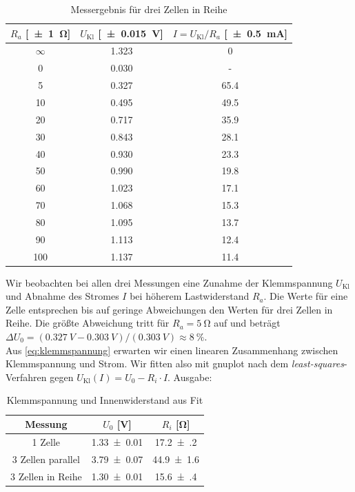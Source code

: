 \begin{table}[H]
  \centering
  \begin{tabular}{c c c} \toprule
    $R_a$ [\SI{\pm1}{\ohm}] & $U_{\text{Kl}}$ [\SI{\pm .015}{V}] & $I=U_{\text{Kl}}/R_a$ [\SI{\pm .5}{mA}] \\ \midrule
    $\infty$ & \num{1.323} & 0 \\
    0 & \num{0.030} & - \\
    5 & \num{0.327} & \num{65.4} \\
    10 & \num{.495} & \num{49.5} \\
    20 & \num{.717} & \num{35.9} \\
    30 & \num{.843} & \num{28.1} \\
    40 & \num{.930} & \num{23.3} \\
    50 & \num{.990} & \num{19.8} \\
    60 & \num{1.023} & \num{17.1} \\
    70 & \num{1.068} & \num{15.3} \\
    80 & \num{1.095} & \num{13.7} \\
    90 & \num{1.113} & \num{12.4} \\
    100 & \num{1.137} & \num{11.4} \\ \bottomrule
  \end{tabular}
  \caption{Messergebnis für drei Zellen in Reihe}
  \label{tab:einezelle}
\end{table}
Wir beobachten bei allen drei Messungen eine Zunahme der Klemmspannung $U_{\text{Kl}}$ und Abnahme des Stromes $I$ bei höherem Lastwiderstand $R_a$. Die Werte für eine Zelle entsprechen bis auf geringe Abweichungen den Werten für drei Zellen in Reihe. Die größte Abweichung tritt für $R_a=\SI{5}{\ohm}$ auf und beträgt $\Delta U_0=(\SI{0.327}{V}-\SI{0.303}{V})/(\SI{0.303}{V})\approx \SI{8}{\percent}$.\\

Aus \cref{eq:klemmspannung} erwarten wir einen linearen Zusammenhang zwischen Klemmspannung und Strom. Wir fitten also mit gnuplot nach dem \textit{least-squares}-Verfahren gegen $U_{\text{Kl}}(I)=U_0-R_i\cdot I$. Ausgabe:
\begin{table}[H]
  \centering
  \begin{tabular}{c c c} \toprule
    Messung & $U_0$ [\si{V}] & $R_i$ [\si{\ohm}] \\ \midrule
    1 Zelle & \num{1.33(1)} & \num{17.2(2)} \\
    3 Zellen parallel & \num{3.79(7)} & \num{44.9(16)} \\
    3 Zellen in Reihe & \num{1.30(1)} & \num{15.6(4)}
  \end{tabular}
  \caption{Klemmspannung und Innenwiderstand aus Fit}
  \label{tab:fita1}
\end{table}

